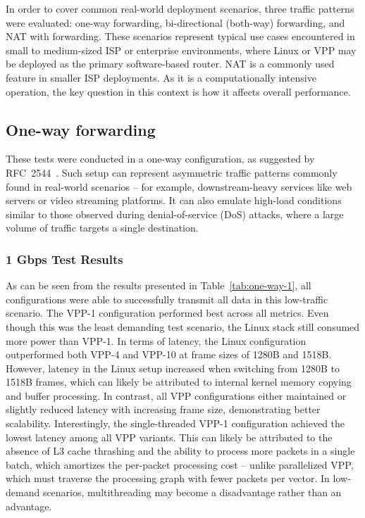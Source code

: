 In order to cover common real-world deployment scenarios, three traffic patterns were evaluated: one-way forwarding, bi-directional (both-way) forwarding, and NAT with forwarding.
These scenarios represent typical use cases encountered in small to medium-sized ISP or enterprise environments, where Linux or VPP may be deployed as the primary software-based router.
NAT is a commonly used feature in smaller ISP deployments. As it is a computationally intensive operation, the key question in this context is how it affects overall performance.

\subsection{One-way forwarding}

These tests were conducted in a one-way configuration, as suggested by \\RFC~2544~\cite{rfc2544}.
Such setup can represent asymmetric traffic patterns commonly found in real-world scenarios -- for example, downstream-heavy services like web servers or video streaming platforms.
It can also emulate high-load conditions similar to those observed during denial-of-service (DoS) attacks, where a large volume of traffic targets a single destination. 

\subsubsection{1 Gbps Test Results}

As can be seen from the results presented in Table~\ref{tab:one-way-1}, all configurations were able to successfully transmit all data in this low-traffic scenario.
The VPP-1 configuration performed best across all metrics. Even though this was the least demanding test scenario, the Linux stack still consumed more power than VPP-1.
In terms of latency, the Linux configuration outperformed both VPP-4 and VPP-10 at frame sizes of 1280B and 1518B.
However, latency in the Linux setup increased when switching from 1280B to 1518B frames, which can likely be attributed to internal kernel memory copying and buffer processing.
In contrast, all VPP configurations either maintained or slightly reduced latency with increasing frame size, demonstrating better scalability.
Interestingly, the single-threaded VPP-1 configuration achieved the lowest latency among all VPP variants.
This can likely be attributed to the absence of L3 cache thrashing and the ability to process more packets in a single batch, which amortizes the per-packet processing cost -- unlike parallelized VPP, 
which must traverse the processing graph with fewer packets per vector.
In low-demand scenarios, multithreading may become a disadvantage rather than an advantage.

